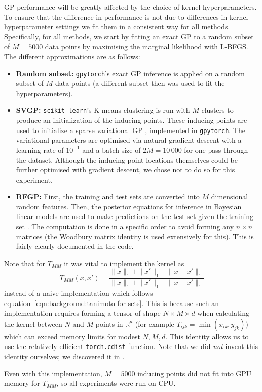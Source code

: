 GP performance will be greatly affected by the choice of kernel hyperparameters.
To ensure that the difference in performance is not due to differences in kernel hyperparameter settings
we fit them in a consistent way for all methods.
Specifically,
for all methods,
we start by fitting an exact GP to a random subset of $M=5000$ data points by maximising the marginal likelihood with L-BFGS.
The different approximations are as follows:
\begin{itemize}
    \item \textbf{Random subset:}
        \texttt{gpytorch}'s exact GP inference is applied on a random subset of $M$ data points
        (a different subset then was used to fit the hyperparameters).
    \item \textbf{SVGP:}
        \texttt{scikit-learn}'s K-means clustering is run with $M$ clusters to produce an initialization of the inducing points.
        These inducing points are used to initialize a sparse variational GP \citep{hensman2013gaussian},
        implemented in \texttt{gpytorch}.
        The variational parameters are optimised via natural gradient descent with a learning rate of $10^{-1}$
        and a batch size of $2M=10\,000$ for one pass through the dataset.
        Although the inducing point locations themselves could be further optimised with gradient descent,
        we chose not to do so for this experiment.
    \item \textbf{RFGP:}
        First, the training and test sets are converted into $M$ dimensional random features.
        Then, the posterior equations for inference in Bayesian linear models
        are used to make predictions on the test set given the training set \citep[equations 3.49--3.51]{bishop2006pattern}.
        The computation is done in a specific order to avoid forming any $n\times n$ matrices
        (the Woodbury matrix identity is used extensively for this).
        This is fairly clearly documented in the code.
\end{itemize}

Note that for $T_{MM}$ it was vital to implement the kernel as
\begin{equation}\label{eqn:minmax-using-l1-distance}
    T_{MM}(x, x') = \frac{\|x\|_1+\|x'\|_1 - \|x-x'\|_1}{\|x\|_1+\|x'\|_1 + \|x-x'\|_1}
\end{equation}
instead of a naive implementation which follows equation~\ref{eqn:background:tanimoto-for-sets}.
This is because such an implementation requires forming a tensor of shape $N\times M \times d$
when calculating the kernel between $N$ and $M$ points in $\mathbb{R}^d$
(for example $T_{ijk}=\min(x_{ik}, y_{jk})$)
which can exceed memory limits for modest $N,M,d$.
This identity allows us to use the relatively efficient \texttt{torch.cdist} function.
Note that we did \emph{not} invent this identity ourselves;
we discovered it in \citet{ioffe2010improved}.

Even with this implementation, $M=5000$ inducing points did not fit into GPU memory for $T_{MM}$,
so all experiments were run on CPU.
